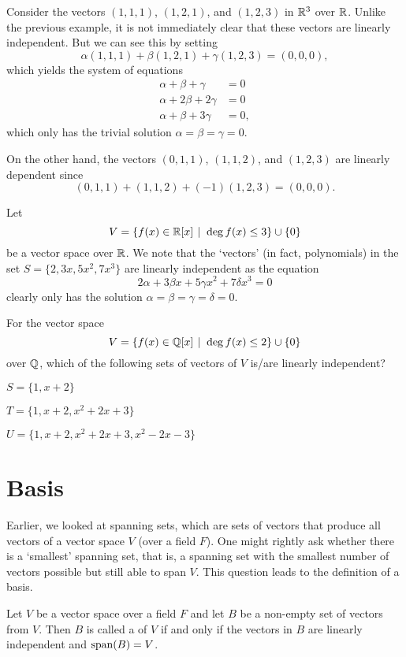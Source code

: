 \begin{example}
    Consider the vectors $(1, 1, 1)$, $(1, 2, 1)$, and $(1, 2, 3)$ in $\mathbb{R}^3$ over $\mathbb{R}$. Unlike the previous example, it is not immediately clear that these vectors are linearly independent. But we can see this by setting
    \[
        \alpha(1, 1, 1) + \beta(1, 2, 1) + \gamma(1, 2, 3) = (0, 0, 0),
    \]
    which yields the system of equations
    \begin{align*}
        \alpha + \beta + \gamma &= 0\\
        \alpha + 2\beta + 2\gamma &= 0\\
        \alpha + \beta + 3\gamma &= 0,
    \end{align*}
    which only has the trivial solution $\alpha = \beta = \gamma = 0$.

    On the other hand, the vectors $(0, 1, 1)$, $(1, 1, 2)$, and $(1, 2, 3)$ are linearly dependent since
    \[
        (0, 1, 1) + (1, 1, 2) + (-1)(1, 2, 3) = (0, 0, 0).
    \]
\end{example}

\begin{example}
    Let
    \[
        V = \{f(x) \in \R[x] \vert \deg f(x) \leq 3\} \cup \{0\}
    \]
    be a vector space over $\mathbb{R}$. We note that the `vectors' (in fact, polynomials) in the set $S = \{2, 3x, 5x^2, 7x^3\}$ are linearly independent as the equation
    \[
        2\alpha + 3\beta x + 5\gamma x^2 + 7\delta x^3 = 0
    \]
    clearly only has the solution $\alpha = \beta = \gamma = \delta = 0$.
\end{example}

\begin{exercise}\label{exercise-polynomial-of-degree-at-most-2-vector-space}
    For the vector space
    \[
        V = \{f(x) \in \Q[x] \vert \deg f(x) \leq 2\} \cup \{0\}
    \]
    over $\mathbb{Q}$, which of the following sets of vectors of $V$ is/are linearly independent?
    \begin{partquestions}{\alph*}
        \item $S = \{1, x + 2\}$
        \item $T = \{1, x + 2, x^2 + 2x + 3\}$
        \item $U = \{1, x + 2, x^2 + 2x + 3, x^2 - 2x - 3\}$
    \end{partquestions}
\end{exercise}

\section{Basis}
Earlier, we looked at spanning sets, which are sets of vectors that produce all vectors of a vector space $V$ (over a field $F$). One might rightly ask whether there is a `smallest' spanning set, that is, a spanning set with the smallest number of vectors possible but still able to span $V$. This question leads to the definition of a basis.
\begin{definition}
    Let $V$ be a vector space over a field $F$ and let $B$ be a non-empty set of vectors from $V$. Then $B$ is called a  of $V$ if and only if the vectors in $B$ are linearly independent and $\mathrm{span}(B) = V$.
\end{definition}

